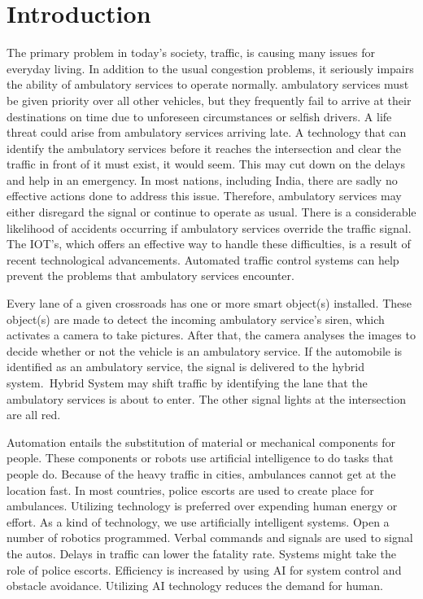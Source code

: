 \documentclass[conference]{IEEEtran}
\begin{document}

\section{Introduction}
The primary problem in today's society, traffic, is causing many issues for everyday living. In addition to the usual congestion problems, it seriously impairs the ability of ambulatory services to operate normally. ambulatory services must be given priority over all other vehicles, but they frequently fail to arrive at their destinations on time due to unforeseen circumstances or selfish drivers. A life threat could arise from ambulatory services arriving late. 
A technology that can identify the ambulatory services before it reaches the intersection and clear the traffic in front of it must exist, it would seem. This may cut down on the delays and help in an emergency. In most nations, including India, there are sadly no effective actions done to address this issue. Therefore, ambulatory services may either disregard the signal or continue to operate as usual. There is a considerable likelihood of accidents occurring if ambulatory services override the traffic signal. The IOT's, which offers an effective way to handle these difficulties, is a result of recent technological advancements. Automated traffic control systems can help prevent the problems that ambulatory services encounter.

Every lane of a given crossroads has one or more smart object(s) installed. These object(s) are made to detect the incoming ambulatory service's siren, which activates a camera to take pictures. After that, the camera analyses the images to decide whether or not the vehicle is an ambulatory service. If the automobile is identified as an ambulatory service, the signal is delivered to the hybrid system. Hybrid System may shift traffic by identifying the lane that the ambulatory services is about to enter. The other signal lights at the intersection are all red.

Automation entails the substitution of material or mechanical components for people. These components or robots use artificial intelligence to do tasks that people do. Because of the heavy traffic in cities, ambulances cannot get at the location fast. In most countries, police escorts are used to create place for ambulances. Utilizing technology is preferred over expending human energy or effort. As a kind of technology, we use artificially intelligent systems. Open a number of robotics programmed. Verbal commands and signals are used to signal the autos. Delays in traffic can lower the fatality rate. Systems might take the role of police escorts. Efficiency is increased by using AI for system control and obstacle avoidance. Utilizing AI technology reduces the demand for human.
\end{document}
